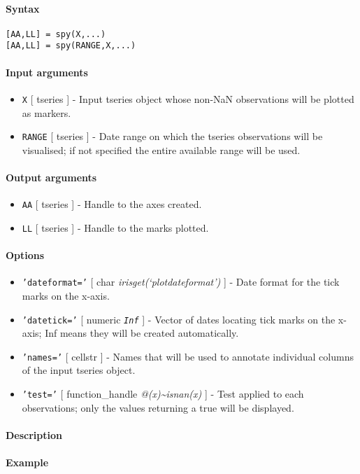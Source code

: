


	\paragraph{Syntax}\label{syntax}

\begin{verbatim}
[AA,LL] = spy(X,...)
[AA,LL] = spy(RANGE,X,...)
\end{verbatim}

\paragraph{Input arguments}\label{input-arguments}

\begin{itemize}
\item
  \texttt{X} {[} tseries {]} - Input tseries object whose non-NaN
  observations will be plotted as markers.
\item
  \texttt{RANGE} {[} tseries {]} - Date range on which the tseries
  observations will be visualised; if not specified the entire available
  range will be used.
\end{itemize}

\paragraph{Output arguments}\label{output-arguments}

\begin{itemize}
\item
  \texttt{AA} {[} tseries {]} - Handle to the axes created.
\item
  \texttt{LL} {[} tseries {]} - Handle to the marks plotted.
\end{itemize}

\paragraph{Options}\label{options}

\begin{itemize}
\item
  \texttt{'dateformat='} {[} char \textbar{}
  \emph{irisget(`plotdateformat')} {]} - Date format for the tick marks
  on the x-axis.
\item
  \texttt{'datetick='} {[} numeric \textbar{} \emph{\texttt{Inf}} {]} -
  Vector of dates locating tick marks on the x-axis; Inf means they will
  be created automatically.
\item
  \texttt{'names='} {[} cellstr {]} - Names that will be used to
  annotate individual columns of the input tseries object.
\item
  \texttt{'test='} {[} function\_handle \textbar{}
  \emph{@(x)\textasciitilde{}isnan(x)} {]} - Test applied to each
  observations; only the values returning a true will be displayed.
\end{itemize}

\paragraph{Description}\label{description}

\paragraph{Example}\label{example}


